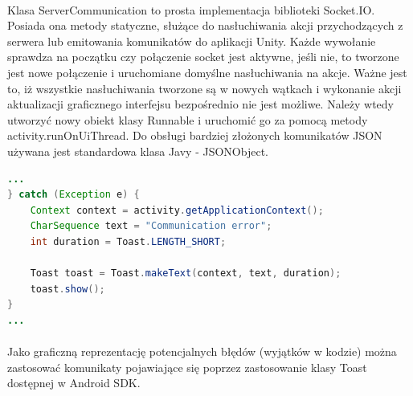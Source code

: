 \paragraph{}
Klasa ServerCommunication to prosta implementacja biblioteki Socket.IO.  Posiada ona metody statyczne, służące do nasłuchiwania akcji przychodzących z serwera lub emitowania komunikatów do aplikacji Unity. Każde wywołanie sprawdza na początku czy połączenie socket jest aktywne, jeśli nie, to tworzone jest nowe połączenie i uruchomiane domyślne nasłuchiwania na akcje. 
Ważne jest to, iż wszystkie nasłuchiwania tworzone są w nowych wątkach i wykonanie akcji aktualizacji graficznego interfejsu bezpośrednio nie jest możliwe. Należy wtedy utworzyć nowy obiekt klasy Runnable i uruchomić go za pomocą metody activity.runOnUiThread. Do obsługi bardziej złożonych komunikatów JSON używana jest standardowa klasa Javy - JSONObject.
\begin{lstlisting}[language=Java]
...
} catch (Exception e) {
    Context context = activity.getApplicationContext();
    CharSequence text = "Communication error";
    int duration = Toast.LENGTH_SHORT;

    Toast toast = Toast.makeText(context, text, duration);
    toast.show();
}
...
\end{lstlisting}
\paragraph{}
Jako graficzną reprezentację potencjalnych błędów (wyjątków w kodzie) można zastosować komunikaty pojawiające się poprzez zastosowanie klasy Toast dostępnej w Android SDK.
